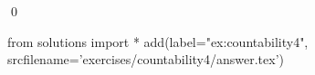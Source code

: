 
\begin{ex} 
  \label{ex:countability4}
  
  \qed
\end{ex} 
\begin{python0}
from solutions import *
add(label="ex:countability4",
    srcfilename='exercises/countability4/answer.tex') 
\end{python0}
